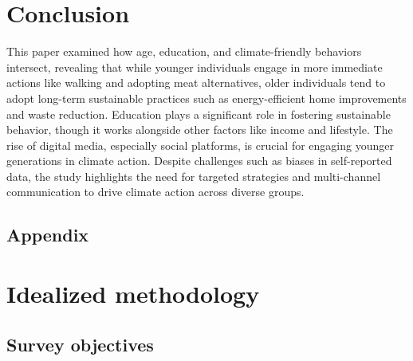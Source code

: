 \documentclass[
  letterpaper,
  DIV=11,
  numbers=noendperiod]{scrartcl}
\begin{document}
\section{Conclusion}\label{sec-conclusion}

This paper examined how age, education, and climate-friendly behaviors
intersect, revealing that while younger individuals engage in more
immediate actions like walking and adopting meat alternatives, older
individuals tend to adopt long-term sustainable practices such as
energy-efficient home improvements and waste reduction. Education plays
a significant role in fostering sustainable behavior, though it works
alongside other factors like income and lifestyle. The rise of digital
media, especially social platforms, is crucial for engaging younger
generations in climate action. Despite challenges such as biases in
self-reported data, the study highlights the need for targeted
strategies and multi-channel communication to drive climate action
across diverse groups.

\newpage

\appendix

\subsection{Appendix}\label{sec-appendix}

\section{Idealized methodology}\label{sec-idealized-meth}

\subsection{Survey objectives}\label{survey-objectives}
\end{document}
